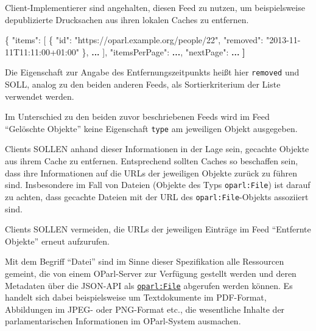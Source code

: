 \documentclass[,a4paper]{article}
\newenvironment{Shaded}{}{}
\newcommand{\DataTypeTok}[1]{\textcolor[rgb]{0.56,0.13,0.00}{{#1}}}
\newcommand{\StringTok}[1]{\textcolor[rgb]{0.25,0.44,0.63}{{#1}}}
\newcommand{\OtherTok}[1]{\textcolor[rgb]{0.00,0.44,0.13}{{#1}}}
\newcommand{\FunctionTok}[1]{\textcolor[rgb]{0.02,0.16,0.49}{{#1}}}
\newcommand{\ErrorTok}[1]{\textcolor[rgb]{1.00,0.00,0.00}{\textbf{{#1}}}}
\begin{document}
Client-Implementierer sind angehalten, diesen Feed zu nutzen, um
beispielsweise depublizierte Drucksachen aus ihren lokalen Caches zu
entfernen.

\begin{Shaded}
\begin{Highlighting}[]
\FunctionTok{\{}
    \DataTypeTok{"items"}\FunctionTok{:} \OtherTok{[}
        \FunctionTok{\{}
            \DataTypeTok{"id"}\FunctionTok{:} \StringTok{"https://oparl.example.org/people/22"}\FunctionTok{,}
            \DataTypeTok{"removed"}\FunctionTok{:} \StringTok{"2013-11-11T11:11:00+01:00"}
        \FunctionTok{\}}\OtherTok{,}
        \ErrorTok{...}
    \OtherTok{]}\FunctionTok{,}
    \DataTypeTok{"itemsPerPage"}\FunctionTok{:} \ErrorTok{...}\FunctionTok{,}
    \DataTypeTok{"nextPage"}\FunctionTok{:} \ErrorTok{...}
\ErrorTok{]}
\end{Highlighting}
\end{Shaded}

Die Eigenschaft zur Angabe des Entfernungszeitpunkts heißt hier
\texttt{removed} und SOLL, analog zu den beiden anderen Feeds, als
Sortierkriterium der Liste verwendet werden.

Im Unterschied zu den beiden zuvor beschriebenen Feeds wird im Feed
``Gelöschte Objekte'' keine Eigenschaft \texttt{type} am jeweiligen
Objekt ausgegeben.

Clients SOLLEN anhand dieser Informationen in der Lage sein, gecachte
Objekte aus ihrem Cache zu entfernen. Entsprechend sollten Caches so
beschaffen sein, dass ihre Informationen auf die URLs der jeweiligen
Objekte zurück zu führen sind. Insbesondere im Fall von Dateien (Objekte
des Typs \texttt{oparl:File}) ist darauf zu achten, dass gecachte
Dateien mit der URL des \texttt{oparl:File}-Objekts assoziiert sind.

Clients SOLLEN vermeiden, die URLs der jeweiligen Einträge im Feed
``Entfernte Objekte'' erneut aufzurufen.


Mit dem Begriff ``Datei'' sind im Sinne dieser Spezifikation alle
Ressourcen gemeint, die von einem OParl-Server zur Verfügung gestellt
werden und deren Metadaten über die JSON-API als
\hyperref[oparlux5fdocument]{\texttt{oparl:File}} abgerufen werden
können. Es handelt sich dabei beispielsweise um Textdokumente im
PDF-Format, Abbildungen im JPEG- oder PNG-Format etc., die wesentliche
Inhalte der parlamentarischen Informationen im OParl-System ausmachen.
\end{document}

